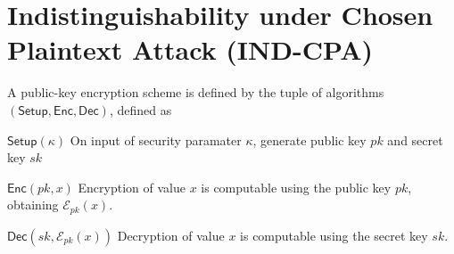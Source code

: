\documentclass[10pt,journal,compsoc]{IEEEtran}
\theoremstyle{definition}
\theoremstyle{definition}
\theoremstyle{remark}
\begin{document}
\appendices
% 
%                                                                                         
%                                                                                         
%                                                                                         
% 

\section{Indistinguishability under Chosen Plaintext Attack (IND-CPA)} \label{app:ind_cpa}
A public-key encryption scheme is defined by the tuple of algorithms $(\mathsf{Setup}, \mathsf{Enc}, \mathsf{Dec})$, defined as
\begin{LaTeXdescription}
    \item[$\mathsf{Setup}(\kappa)$] On input of security paramater $\kappa$, generate public key $pk$ and secret key $sk$
    \item[$\mathsf{Enc}(pk, x)$] Encryption of value $x$ is computable using the public key $pk$, obtaining $\mathcal{E}_{pk}(x)$.
    \item[$\mathsf{Dec}(sk, \mathcal{E}_{pk}(x))$] Decryption of value $x$ is computable using the secret key $sk$.
\end{LaTeXdescription}
\end{document}
